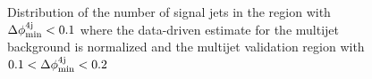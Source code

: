 \begin{figure}[h!]
\centering 
{}
\caption{Distribution of the number of signal jets in  the region with $\Delta\phi_{\rm{min}}^{4{\rm{j}}} < 0.1$ where the data-driven estimate for the multijet background is normalized and  the multijet validation region with $0.1 < \Delta\phi_{\rm{min}}^{4{\rm{j}}} < 0.2$}\label{fig:jet_smear_jetn}
\end{figure} 


